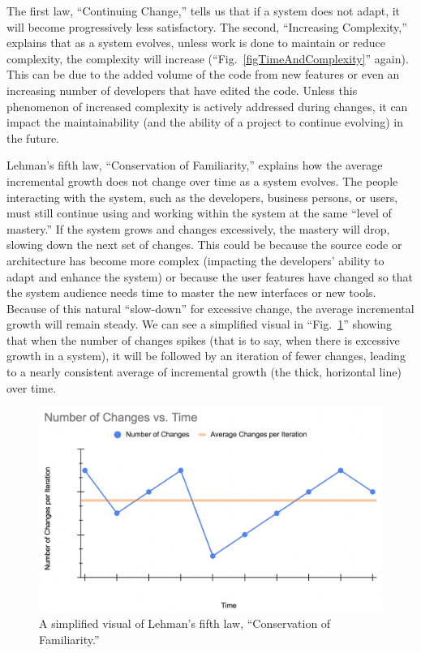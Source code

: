 \documentclass[12pt,conference]{IEEEtran}
\begin{document}
The first law, ``Continuing Change,'' tells us that if a system does not adapt, it will become progressively less satisfactory. The second, ``Increasing Complexity,'' explains that as a system evolves, unless work is done to maintain or reduce complexity, the complexity will increase (``Fig.~\ref{figTimeAndComplexity}'' again). This can be due to the added volume of the code from new features or even an increasing number of developers that have edited the code. Unless this phenomenon of increased complexity is actively addressed during changes, it can impact the maintainability (and the ability of a project to continue evolving) in the future.

Lehman's fifth law, ``Conservation of Familiarity,'' explains how the average incremental growth does not change over time as a system evolves. The people interacting with the system, such as the developers, business persons, or users, must still continue using and working within the system at the same ``level of mastery.'' If the system grows and changes excessively, the mastery will drop, slowing down the next set of changes. This could be because the source code or architecture has become more complex (impacting the developers' ability to adapt and enhance the system) or because the user features have changed so that the system audience needs time to master the new interfaces or new tools. Because of this natural ``slow-down'' for excessive change, the average incremental growth will remain steady. We can see a simplified visual in ``Fig.~\ref{figConservationOfFamiliarity}'' showing that when the number of changes spikes (that is to say, when there is excessive growth in a system), it will be followed by an iteration of fewer changes, leading to a nearly consistent average of incremental growth (the thick, horizontal line) over time.

\begin{figure}[ht]
    \centerline{
        \includegraphics[width=\columnwidth]{Changes-vs-Time}
    }
    \caption{A simplified visual of Lehman's fifth law, ``Conservation of Familiarity.''}
    \label{figConservationOfFamiliarity}
\end{figure}
\end{document}
